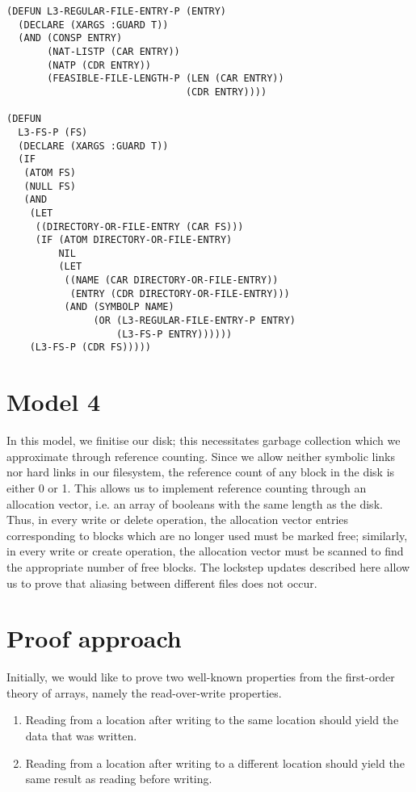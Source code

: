 \documentclass[format=sigconf,review=true]{acmart}
\begin{document}
\begin{lstlisting}
(DEFUN L3-REGULAR-FILE-ENTRY-P (ENTRY)
  (DECLARE (XARGS :GUARD T))
  (AND (CONSP ENTRY)
       (NAT-LISTP (CAR ENTRY))
       (NATP (CDR ENTRY))
       (FEASIBLE-FILE-LENGTH-P (LEN (CAR ENTRY))
                               (CDR ENTRY))))

(DEFUN
  L3-FS-P (FS)
  (DECLARE (XARGS :GUARD T))
  (IF
   (ATOM FS)
   (NULL FS)
   (AND
    (LET
     ((DIRECTORY-OR-FILE-ENTRY (CAR FS)))
     (IF (ATOM DIRECTORY-OR-FILE-ENTRY)
         NIL
         (LET
          ((NAME (CAR DIRECTORY-OR-FILE-ENTRY))
           (ENTRY (CDR DIRECTORY-OR-FILE-ENTRY)))
          (AND (SYMBOLP NAME)
               (OR (L3-REGULAR-FILE-ENTRY-P ENTRY)
                   (L3-FS-P ENTRY))))))
    (L3-FS-P (CDR FS)))))
\end{lstlisting}

\section{Model 4}
In this model, we finitise our disk; this necessitates garbage
collection which we approximate through reference
counting. Since we allow neither symbolic links nor hard links in our
filesystem, the reference count of any block in the disk is either 0
or 1. This allows us to implement reference counting through an
allocation vector, i.e. an array of booleans with the same length as
the disk. Thus, in every write or delete operation, the allocation
vector entries corresponding to blocks which are no longer used must
be marked free; similarly, in every write or create operation, the
allocation vector must be scanned to find the appropriate number of
free blocks. The lockstep updates described here allow us to prove
that aliasing between different files does not occur.

\section {Proof approach}

Initially, we would like to prove two well-known properties from the
first-order theory of arrays, namely the read-over-write properties.

\begin {enumerate}
\item Reading from a location after writing to the same location
  should yield the data that was written.
\item Reading from a location after writing to a different
  location should yield the same result as reading before writing.
\end {enumerate}
\end{document}
